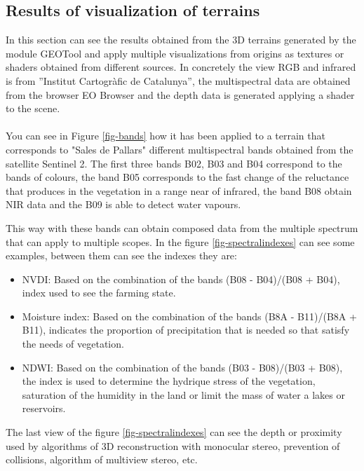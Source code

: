 \documentclass[10pt,a4paper,twocolumn,twoside]{article}
\begin{document}
\subsection{Results of visualization of terrains}
In this section can see the results obtained from the 3D terrains generated by the module GEOTool and apply multiple visualizations from origins as textures or shaders obtained from different sources. In concretely the view RGB and infrared is from ''Institut Cartogràfic de Catalunya'', the multispectral data are obtained from the browser EO Browser\cite{eobrowser} and the depth data is generated applying a shader to the scene.
\\
\\
You can see in Figure \ref{fig-bands} how it has been applied to a terrain that corresponds to "Sales de Pallars" different multispectral bands obtained from the satellite Sentinel 2\cite{sentinel2}. The first three bands B02, B03 and B04 correspond to the bands of colours, the band B05 corresponds to the fast change of the reluctance that produces in the vegetation in a range near of infrared, the band B08 obtain NIR\cite{nir} data and the B09 is able to detect water vapours.

This way with these bands can obtain composed data from the multiple spectrum that can apply to multiple scopes. In the figure \ref{fig-spectralindexes} can see some examples, between them can see the indexes they are:

\begin{itemize}
\item 
{
	NVDI\cite{ndvi}: Based on the combination of the bands (B08 - B04)/(B08 + B04), index used to see the farming state.
}
\item
{
	Moisture index\cite{moisture}: Based on the combination of the bands (B8A - B11)/(B8A + B11), indicates the proportion of precipitation that is needed so that satisfy the needs of vegetation.
}
\item
{
	NDWI\cite{ndwi}: Based on the combination of the bands (B03 - B08)/(B03 + B08), the index is used to determine the hydrique stress of the vegetation, saturation of the humidity in the land or limit the mass of water a lakes or reservoirs.
}
\end{itemize} 

The last view of the figure \ref{fig-spectralindexes} can see the depth or proximity used by algorithms of 3D reconstruction with monocular stereo, prevention of collisions, algorithm of multiview stereo, etc.
\end{document}
